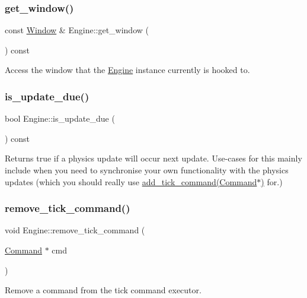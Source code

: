 \subsubsection{\texorpdfstring{get\+\_\+window()}{get\_window()}}
{\footnotesize\ttfamily const \mbox{\hyperlink{class_window}{Window}} \& Engine\+::get\+\_\+window (\begin{DoxyParamCaption}{ }\end{DoxyParamCaption}) const}

Access the window that the \mbox{\hyperlink{class_engine}{Engine}} instance currently is hooked to. \mbox{\label{class_engine_a6ae98509fe0117b583f9edb6812e3363}} 
\subsubsection{\texorpdfstring{is\+\_\+update\+\_\+due()}{is\_update\_due()}}
{\footnotesize\ttfamily bool Engine\+::is\+\_\+update\+\_\+due (\begin{DoxyParamCaption}{ }\end{DoxyParamCaption}) const}

Returns true if a physics update will occur next update. Use-\/cases for this mainly include when you need to synchronise your own functionality with the physics updates (which you should really use \mbox{\hyperlink{class_engine_ab2355e889851bc53a6a9e151ca2a1e98}{add\+\_\+tick\+\_\+command(\+Command$\ast$)}} for.) \mbox{\label{class_engine_abb354476292180d9db9b4b70d3057096}} 
\subsubsection{\texorpdfstring{remove\+\_\+tick\+\_\+command()}{remove\_tick\_command()}}
{\footnotesize\ttfamily void Engine\+::remove\+\_\+tick\+\_\+command (\begin{DoxyParamCaption}\item[{\mbox{\hyperlink{class_command}{Command}} $\ast$}]{cmd }\end{DoxyParamCaption})}

Remove a command from the tick command executor. \mbox{\label{class_engine_ad02b6f115de1ce69088c5784cc937d04}} 
